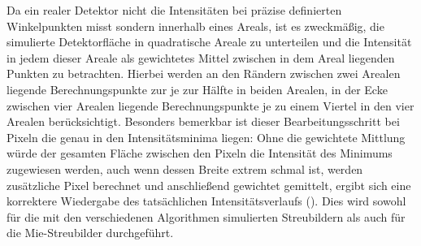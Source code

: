 Da ein realer Detektor nicht die Intensitäten bei präzise definierten Winkelpunkten misst sondern innerhalb eines Areals, ist es zweckmäßig, die simulierte Detektorfläche in quadratische Areale zu unterteilen und die Intensität in jedem dieser Areale als gewichtetes Mittel zwischen in dem Areal liegenden Punkten zu betrachten.
Hierbei werden an den Rändern zwischen zwei Arealen liegende Berechnungspunkte zur je zur Hälfte in beiden Arealen, in der Ecke zwischen vier Arealen liegende Berechnungspunkte je zu einem Viertel in den vier Arealen berücksichtigt.
Besonders bemerkbar ist dieser Bearbeitungsschritt bei Pixeln die genau in den Intensitätsminima liegen: Ohne die gewichtete Mittlung würde der gesamten Fläche zwischen den Pixeln die Intensität des Minimums zugewiesen werden, auch wenn dessen Breite extrem schmal ist, werden zusätzliche Pixel berechnet und anschließend gewichtet gemittelt, ergibt sich eine korrektere Wiedergabe des tatsächlichen Intensitätsverlaufs (). Dies wird sowohl für die mit den verschiedenen Algorithmen simulierten Streubildern als auch für die Mie-Streubilder durchgeführt.

